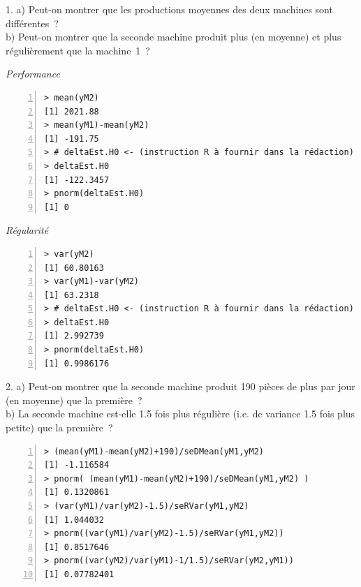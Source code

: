 \documentclass[10pt]{report}
\begin{document}
\begin{exercice}
1. a) Peut-on montrer que les productions moyennes des deux machines sont diff{\'e}rentes~?\\
b) Peut-on montrer que la seconde machine produit plus (en moyenne) et plus r{\'e}guli{\`e}rement que la machine~1~?

\IndicR
\noindent \textit{Performance}
\begin{Verbatim}[frame=leftline,fontfamily=tt,fontshape=n,numbers=left]
> mean(yM2)
[1] 2021.88
> mean(yM1)-mean(yM2)
[1] -191.75
> # deltaEst.H0 <- (instruction R à fournir dans la rédaction)
> deltaEst.H0
[1] -122.3457
> pnorm(deltaEst.H0)
[1] 0
\end{Verbatim}

\noindent \textit{Régularité}
\begin{Verbatim}[frame=leftline,fontfamily=tt,fontshape=n,numbers=left]
> var(yM2)
[1] 60.80163
> var(yM1)-var(yM2)
[1] 63.2318
> # deltaEst.H0 <- (instruction R à fournir dans la rédaction)
> deltaEst.H0
[1] 2.992739
> pnorm(deltaEst.H0)
[1] 0.9986176
\end{Verbatim}



 
2. a) Peut-on montrer que la seconde machine produit 190 pi{\`e}ces de plus par jour (en moyenne) que la premi{\`e}re~?  \\

b) La seconde machine est-elle 1.5 fois plus r{\'e}guli{\`e}re (i.e. de variance 1.5 fois plus petite) que la premi{\`e}re~? \\

\begin{Verbatim}[frame=leftline,fontfamily=tt,fontshape=n,numbers=left]
> (mean(yM1)-mean(yM2)+190)/seDMean(yM1,yM2)
[1] -1.116584
> pnorm( (mean(yM1)-mean(yM2)+190)/seDMean(yM1,yM2) )
[1] 0.1320861
> (var(yM1)/var(yM2)-1.5)/seRVar(yM1,yM2)
[1] 1.044032
> pnorm((var(yM1)/var(yM2)-1.5)/seRVar(yM1,yM2))
[1] 0.8517646
> pnorm((var(yM2)/var(yM1)-1/1.5)/seRVar(yM2,yM1))
[1] 0.07782401
\end{Verbatim}



\end{exercice}
\end{document}
